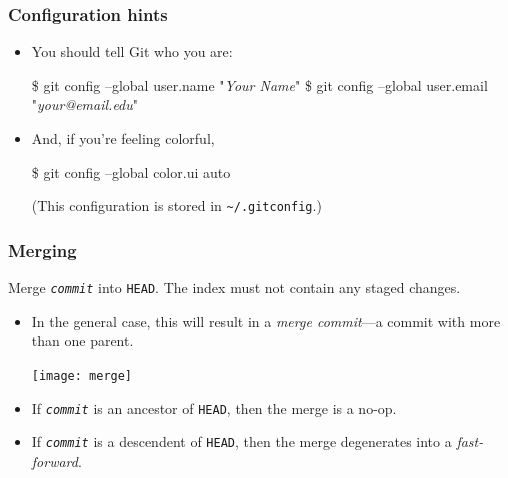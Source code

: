 \documentclass{beamer}
\makeatletter
\newcommand{\sh}[1]{\$ {\color{beamer@blendedblue}#1}}
\makeatother
\begin{document}
\begin{frame}[fragile]
  \frametitle{Configuration hints}

  \begin{itemize}
    \item You should tell Git who you are:
\begin{semiverbatim}
\sh{git config --global user.name "\textit{Your Name}"}
\sh{git config --global user.email "\textit{your@email.edu}"}
\end{semiverbatim}
    \item And, if you're feeling colorful,
\begin{semiverbatim}
\sh{git config --global color.ui auto}
\end{semiverbatim}
    (This configuration is stored in \texttt{\~{}/.gitconfig}.)
  \end{itemize}
\end{frame}

\begin{frame}
  \frametitle{Merging}
  \begin{description}
  \item[\texttt{git merge \textit{commit}}\hfill] Merge
    \texttt{\textit{commit}} into \texttt{HEAD}. The index must not
    contain any staged changes.
  \end{description}

  \begin{itemize}
  \item In the general case, this will result in a \emph{merge
      commit}---a commit with more than one parent.
    \begin{center}
      \texttt{[image: merge]}
    \end{center}
  \item If \texttt{\textit{commit}} is an ancestor of \texttt{HEAD},
    then the merge is a no-op.
  \item If \texttt{\textit{commit}} is a descendent of \texttt{HEAD},
    then the merge degenerates into a \emph{fast-forward}.
  \end{itemize}
\end{frame}
\end{document}
